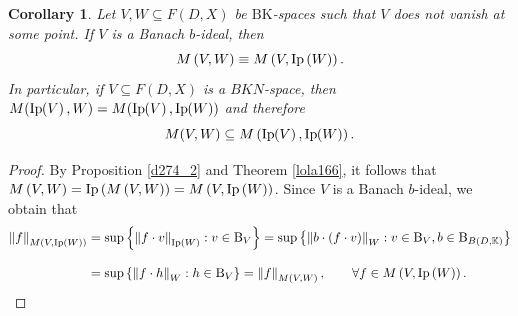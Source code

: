 \documentclass[14pt, a4paper]{article}  %
\providecommand{\llave}[1]{\left\lbrace #1\right\rbrace }
\providecommand{\pare}[1]{\left( #1\right) }
\providecommand{\norm}[1]{\left\lVert#1\right\rVert}
\newcommand{\K}{\mathbb{K}}
\newcommand{\BK}{\text{BK}}
\newcommand{\B}{\textup{B}}
\newtheorem{corollary}{Corollary}[section]
\begin{document}
	  \begin{corollary}\label{lola84_0}
	  	Let $V,W\subseteq F\pare{D,X}$ be $\BK$-spaces such that $V$ does not vanish at some point. If $V$ is a Banach $b$-ideal, then
	  	\begin{equation}
	  		M\pare{V,W}\equiv M\pare{V,\text{Ip}\hspace{-0pt}\pare{W}}.
	  	\end{equation} 
	  	In particular, if $V\subseteq F\pare{D,X}$ is a $BKN$-space, then
	  	$M(\textnormal{Ip}\hspace{-2pt}\pare{V}, W) = M(\textnormal{Ip}\hspace{-2pt}\pare{V}, \textnormal{Ip}\hspace{-2pt}\pare{W})$ and therefore \begin{equation}
	  		M(V,W) \subseteq  M\pare{\textnormal{Ip}\hspace{-2pt}\pare{V}, \textnormal{Ip}\hspace{-2pt}\pare{W}}.
	  	\end{equation}
	  \end{corollary}
	  \begin{proof}
	  	By Proposition \ref{d274_2} and Theorem \ref{lola166}, it follows that 
	  	$M\pare{V,W}=\text{Ip}\hspace{-0pt}\pare{M\pare{V,W}}= M\pare{V,\text{Ip}\hspace{-0pt}\pare{W}}$.
	  	Since $V$ is a Banach $b$-ideal, we obtain that \setlength{\belowdisplayskip}{-4pt}
	  	\begin{align*} 
	  		\norm{f}_{M\pare{V,\text{Ip}\hspace{-0pt}\pare{W}}}
	  		&=\sup\llave{\norm{f\cdot v}_{\text{Ip}\hspace{-0pt}\pare{W}}:v\in \B_{V}}
	  		=\sup\llave{\norm{b\cdot\pare{f\cdot v}}_{W}:v\in \B_{V}, b\in \B_{B\pare{D,\K}}}\\[.3 cm] 
	  		&=\sup\llave{\norm{f\cdot h}_{W}:h\in \B_{V}}
	  		=\norm{f}_{M\pare{V,W}},\qquad 
	  		\forall f\in M\pare{V,\text{Ip}\hspace{-0pt}\pare{W}}.\qedhere
	  	\end{align*}
	  \end{proof} 
	  
\end{document}

